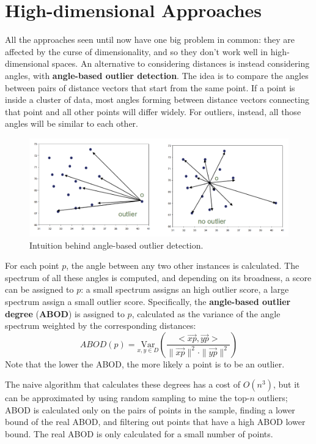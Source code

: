 \section{High-dimensional Approaches}

All the approaches seen until now have one big problem in common: they are affected by the curse of dimensionality, and so they don't work well in high-dimensional spaces. An alternative to considering distances is instead considering angles, with \textbf{angle-based outlier detection}. The idea is to compare the angles between pairs of distance vectors that start from the same point. If a point is inside a cluster of data, most angles forming between distance vectors connecting that point and all other points will differ widely. For outliers, instead, all those angles will be similar to each other.
\begin{figure}[ht]
    \centering
    \includegraphics[width=0.7\linewidth]{img/angle_based_od.png}
    \caption{Intuition behind angle-based outlier detection.}
    \label{fig:angle-based}
\end{figure}
For each point $p$, the angle between any two other instances is calculated. The spectrum of all these angles is computed, and depending on its broadness, a score can be assigned to $p$: a small spectrum assigns an high outlier score, a large spectrum assign a small outlier score. Specifically, the \textbf{angle-based outlier degree} (\textbf{ABOD}) is assigned to $p$, calculated as the variance of the angle spectrum weighted by the corresponding distances:
\begin{equation*}
    \textit{ABOD}(p) = \underset{x,y \in D}{\mathrm{Var}} \left ( \dfrac{< \vec{xp}, \vec{yp} >}{\|\vec{xp}\|^2 \cdot \|\vec{yp}\|^2}  \right )
\end{equation*}
Note that the lower the ABOD, the more likely a point is to be an outlier.

The naive algorithm that calculates these degrees has a cost of $O(n^3)$, but it can be approximated by using random sampling to mine the top-$n$ outliers; ABOD is calculated only on the pairs of points in the sample, finding a lower bound of the real ABOD, and filtering out points that have a high ABOD lower bound. The real ABOD is only calculated for a small number of points.

